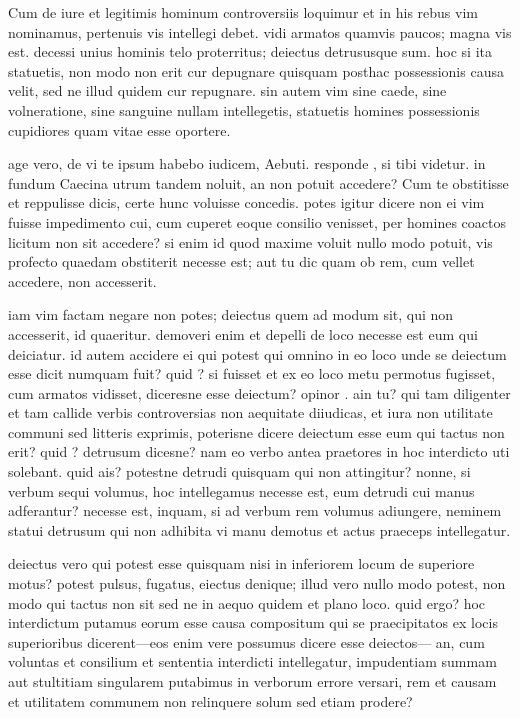  Cum de iure et legitimis hominum controversiis loquimur et in his rebus vim nominamus, pertenuis vis intellegi debet. vidi armatos quamvis paucos; magna vis est. decessi unius hominis telo proterritus; deiectus detrususque sum. hoc si ita statuetis, non modo non erit cur depugnare quisquam posthac possessionis causa velit, sed ne illud quidem cur repugnare. sin autem vim sine caede, sine volneratione, sine sanguine nullam intellegetis, statuetis homines possessionis cupidiores quam vitae esse oportere.

 age vero, de vi te ipsum habebo iudicem, Aebuti. responde , si tibi videtur. in fundum Caecina utrum tandem noluit, an non potuit accedere? Cum te obstitisse et reppulisse dicis, certe hunc voluisse concedis. potes igitur dicere non ei vim fuisse impedimento cui, cum cuperet eoque consilio venisset, per homines coactos licitum non sit accedere? si enim id quod maxime voluit nullo modo potuit, vis profecto quaedam obstiterit necesse est; aut tu dic quam ob rem, cum vellet accedere, non accesserit.

 iam vim factam negare non potes; deiectus quem ad modum sit, qui non accesserit, id quaeritur. demoveri enim et depelli de loco necesse est eum qui deiciatur. id autem accidere ei qui potest qui omnino in eo loco unde se deiectum esse dicit numquam fuit? quid ? si fuisset et ex eo loco metu permotus fugisset, cum armatos vidisset, diceresne esse deiectum? opinor . ain tu? qui tam diligenter et tam callide verbis controversias non aequitate diiudicas, et iura non utilitate communi sed litteris exprimis, poterisne dicere deiectum esse eum qui tactus non erit? quid ? detrusum dicesne? nam eo verbo antea praetores in hoc interdicto uti solebant. quid ais? potestne detrudi quisquam qui non attingitur? nonne, si verbum sequi volumus, hoc intellegamus necesse est, eum detrudi cui manus adferantur? necesse est, inquam, si ad verbum rem volumus adiungere, neminem statui detrusum qui non adhibita vi manu demotus et actus praeceps intellegatur.

 deiectus vero qui potest esse quisquam nisi in inferiorem locum de superiore motus? potest pulsus, fugatus, eiectus denique; illud vero nullo modo potest, non modo qui tactus non sit sed ne in aequo quidem et plano loco. quid ergo? hoc interdictum putamus eorum esse causa compositum qui se praecipitatos ex locis superioribus dicerent—eos enim vere possumus dicere esse deiectos— an, cum voluntas et consilium et sententia interdicti intellegatur, impudentiam summam aut stultitiam singularem putabimus in verborum errore versari, rem et causam et utilitatem communem non relinquere solum sed etiam prodere?

